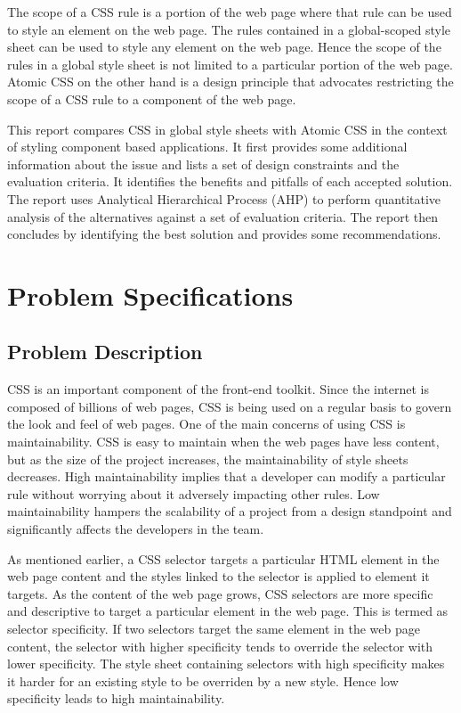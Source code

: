 \documentclass[12pt]{article}
\begin{document}
\vspace{0.5cm}

The scope of a CSS rule is a portion of the web page where that rule can be used to style an element on the web page. The rules contained in a global-scoped style sheet can be used to style any element on the web page. Hence the scope of the rules in a global style sheet is not limited to a particular portion of the web page. Atomic CSS on the other hand is a design principle that advocates restricting the scope of a CSS rule to a component of the web page.

This report compares CSS in global style sheets with Atomic CSS in the context of styling component based applications. It first provides some additional information about the issue and lists a set of design constraints and the evaluation criteria. It identifies the benefits and pitfalls of each accepted solution. The report uses Analytical Hierarchical Process (AHP) to perform quantitative analysis of the alternatives against a set of evaluation criteria. The report then concludes by identifying the best solution and provides some recommendations.

\newpage

\section{Problem Specifications}
\subsection{Problem Description}
CSS is an important component of the front-end toolkit. Since the internet is composed of billions of web pages, CSS is being used on a regular basis to govern the look and feel of web pages. One of the main concerns of using CSS is maintainability. CSS is easy to maintain when the web pages have less content, but as the size of the project increases, the maintainability of style sheets decreases. High maintainability implies that a developer can modify a particular rule without worrying about it adversely impacting other rules. Low maintainability hampers the scalability of a project from a design standpoint and significantly affects the developers in the team.


As mentioned earlier, a CSS selector targets a particular HTML element in the web page content and the styles linked to the selector is applied to element it targets. As the content of the web page grows, CSS selectors are more specific and descriptive to target a particular element in the web page. This is termed as selector specificity. If two selectors target the same element in the web page content, the selector with higher specificity tends to override the selector with lower specificity. The style sheet containing selectors with high specificity makes it harder for an existing style to be overriden by a new style. Hence low specificity leads to high maintainability.
\end{document}
